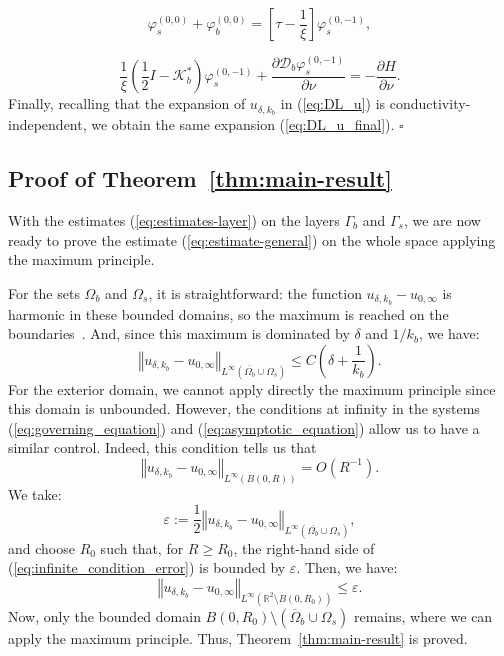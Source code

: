 \documentclass[final]{siamltex}
\numberwithin{equation}{section}
\numberwithin{figure}{section}
\numberwithin{table}{section}
\newcommand{\cqfd}{\hfill $\square$}
\begin{document}
\begin{equation}
\varphi_{s}^{(0,0)}+\varphi_{b}^{(0,0)}=\left[\tau-\frac{1}{\xi}\right]\varphi_{s}^{(0,-1)},\label{eq:phis0+phib0(bis)}
\end{equation}

\begin{equation}
\frac{1}{\xi}\left(\frac{1}{2}I-\mathcal{K}_{b}^{*}\right)\varphi_{s}^{(0,-1)}+\frac{\partial\mathcal{D}_{b}\varphi_{s}^{(0,-1)}}{\partial\nu}=-\frac{\partial H}{\partial\nu}.\label{eq:definition_phis_-1(bis)}
\end{equation}
 Finally, recalling that the expansion of $u_{\delta,k_{b}}$ in (\ref{eq:DL_u})
is conductivity-independent, we obtain the same expansion
(\ref{eq:DL_u_final}). \cqfd


\subsection{Proof of Theorem~\ref{thm:main-result}}

With the estimates (\ref{eq:estimates-layer}) on the layers $\Gamma_{b}$
and $\Gamma_{s}$, we are now ready to prove the estimate (\ref{eq:estimate-general})
on the whole space applying the maximum principle.

For the sets $\Omega_{b}$ and $\Omega_{s}$, it is straightforward:
the function $u_{\delta,k_{b}}-u_{0,\infty}$ is harmonic in these
bounded domains, so the maximum is reached on the boundaries~\cite{taylor1}.
And, since this maximum is dominated by $\delta$ and $1/k_{b}$,
we have:
\[
\left\Vert u_{\delta,k_{b}}-u_{0,\infty}\right\Vert _{L^{\infty}(\bar{\Omega_{b}}
\cup\Omega_{s})}\leq C\left(\delta+\frac{1}{k_{b}}\right).
\]
For the exterior domain, we cannot apply directly the maximum
principle since this domain is unbounded. However, the conditions
at infinity in the systems (\ref{eq:governing_equation}) and
(\ref{eq:asymptotic_equation}) allow us to have a similar control.
Indeed, this condition tells us that
\begin{equation}
\left\Vert u_{\delta,k_{b}}-u_{0,\infty}\right\Vert
_{L^{\infty}(B(0,R))}=O(R^{-1}).\label{eq:infinite_condition_error}
\end{equation}
 We take:
\[
\varepsilon:=\frac{1}{2}\left\Vert u_{\delta,k_{b}}-u_{0,\infty}\right\Vert _{L^{\infty}(\bar{\Omega_{b}}\cup\Omega_{s})},
\]
 and choose $R_{0}$ such that, for $R\geq R_{0}$, the right-hand side of
(\ref{eq:infinite_condition_error}) is bounded by $\varepsilon$.
Then, we have:
\[
\left\Vert u_{\delta,k_{b}}-u_{0,\infty}\right\Vert
_{L^{\infty}(\mathbb{R}^{2}\setminus B(0,R_{0}))}\leq\varepsilon.
\]
 Now, only the bounded domain $B(0,R_{0})\setminus\left(\overline{\Omega}_{b}\cup\Omega_{s}\right)$
remains, where we can apply the maximum principle. Thus, Theorem~\ref{thm:main-result}
is proved.
\end{document}
